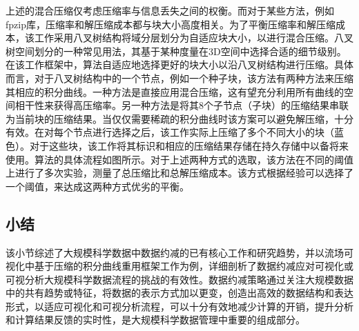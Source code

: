 上述的混合压缩仅考虑压缩率与信息丢失之间的权衡。而对于某些方法，例如fpzip库，压缩率和解压缩成本都与块大小高度相关。为了平衡压缩率和解压缩成本，该工作采用八叉树结构将域分层划分为自适应块大小，以进行混合压缩。八叉树空间划分的一种常见用法，其基于某种度量在3D空间中选择合适的细节级别。在该工作框架中，算法自适应地选择更好的块大小以沿八叉树结构进行压缩。具体而言，对于八叉树结构中的一个节点，例如一个种子块，该方法有两种方法来压缩其相应的积分曲线。一种方法是直接应用混合压缩，这有望充分利用所有曲线的空间相干性来获得高压缩率。另一种方法是将其8个子节点（子块）的压缩结果串联为当前块的压缩结果。当仅仅需要稀疏的积分曲线时该方案可以避免解压缩，十分有效。在对每个节点进行选择之后，该工作实际上压缩了多个不同大小的块（蓝色）。对于这些块，该工作将其标识和相应的压缩结果存储在持久存储中以备将来使用。算法的具体流程如图所示。对于上述两种方式的选取，该方法在不同的阈值上进行了多次实验，测量了总压缩比和总解压缩成本。该方式根据经验可以选择了一个阈值，来达成这两种方式优劣的平衡。

\subsection{小结}
该小节综述了大规模科学数据中数据约减的已有核心工作和研究趋势，并以流场可视化中基于压缩的积分曲线重用框架工作为例，详细剖析了数据约减应对可视化或可视分析大规模科学数据流程的挑战的有效性。数据约减策略通过关注大规模数据中的共有趋势或特征，将数据的表示方式加以更变，创造出高效的数据结构和表达形式，以适应可视化和可视分析流程，可以十分有效地减少计算的开销，提升分析和计算结果反馈的实时性，是大规模科学数据管理中重要的组成部分。


